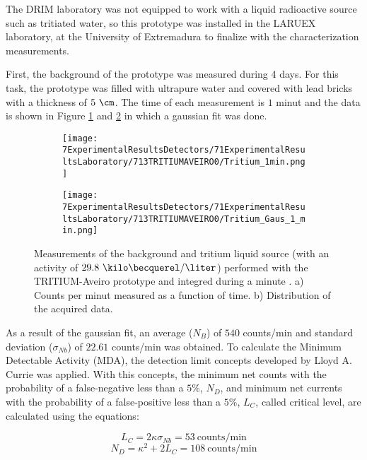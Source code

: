 The DRIM laboratory was not equipped to work with a liquid radioactive source such as tritiated water, so this prototype was installed in the LARUEX laboratory, at the University of Extremadura to finalize with the characterization measurements. 

First, the background of the prototype was measured during 4 days. For this task, the prototype was filled with ultrapure water and covered with lead bricks with a thickness of $5~\cm$. The time of each measurement is $1$ minut and the data is shown in Figure \ref{subfig:MeasurementInRealTime} and \ref{subfig:DistributionofMeasurement} in which a gaussian fit was done. 

\begin{figure}
\centering
    \begin{subfigure}[b]{0.45\textwidth}
    \centering
    \texttt{[image: 7ExperimentalResultsDetectors/71ExperimentalResultsLaboratory/713TRITIUMAVEIRO0/Tritium\_1min.png]}  
    \caption{\label{subfig:MeasurementInRealTime}}
    \end{subfigure}
    \hfill
    \begin{subfigure}[b]{0.45\textwidth}
    \centering
    \texttt{[image: 7ExperimentalResultsDetectors/71ExperimentalResultsLaboratory/713TRITIUMAVEIRO0/Tritium\_Gaus\_1\_min.png]}  
    \caption{\label{subfig:DistributionofMeasurement}}
    \end{subfigure}
 \caption{Measurements of the background and tritium liquid source (with an activity of $29.8~\kilo\becquerel/\liter$) performed with the TRITIUM-Aveiro prototype and integred during a minute \cite{ExperimentalPaperCarlos}. a) Counts per minut measured as a function of time. b) Distribution of the acquired data.}
 \label{fig:BackgroundTritium1min}
\end{figure}

As a result of the gaussian fit, an average ($N_B$) of $540$ counts/min and standard deviation ($\sigma_{Nb}$) of $22.61$ counts/min was obtained. To calculate the Minimum Detectable Activity (MDA), the detection limit concepts developed by Lloyd A. Currie \cite{CurieLimit} was applied.  With this concepts, the minimum net counts with the probability of a false-negative less than a $5\%$, $N_D$, and minimum net currents with the probability of a false-positive less than a $5\%$, $L_C$, called critical level, are calculated using the equations:

\begin{equation}
L_C = 2\kappa\sigma_{Nb} =53 ~\text{counts/min}
\label{eq:EquationCriticalLimit}
\end{equation}
\begin{equation}
N_D = \kappa^2 + 2L_C = 108~\text{counts/min}
\label{eq:EquationNetCounts}
\end{equation}

